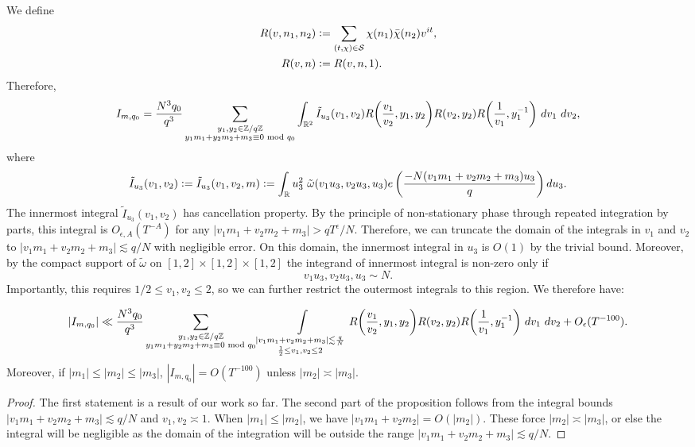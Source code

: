 We define \begin{align*}
	R(v,n_1,n_2)&\mathrel{\mathop:}= \sum_{(t,\chi)\in \mathcal{S}} 
	\chi({n_1})\bar{\chi}(n_2)v^{it},\\
	R(v,n)&\mathrel{\mathop:}= R(v,n,1).
\end{align*}
Therefore, \begin{equation*}
    I_{m,q_0} = \frac{N^3q_0}{q^3} \sum_{\substack{y_1,y_2 \in\mathbb{Z}/q\mathbb{Z} \\ y_1m_1+y_2m_2+m_3\equiv 0 \mod q_0}}\int_{\reals^2} \tilde{I}_{u_3}(v_1,v_2)  R{\left(\frac{v_1}{v_2},y_1,y_2\right)}R {\left(v_2,y_2\right)}R{\left(\frac{1}{v_1},y_1^{-1}\right)} \ dv_1\ dv_2,
\end{equation*}
    where\[
     \tilde{I}_{u_3}(v_1,v_2)\defeq \tilde{I}_{u_3}(v_1,v_2,m)\defeq \int_\reals u_3^2 \ \tilde{\omega}(v_1u_3,v_2u_3,u_3) e\left(\frac{-N(v_1m_1+v_2m_2+m_3)u_3}{q}\right)  du_3.\]
The innermost integral $\tilde{I}_{u_3}(v_1,v_2)$ has cancellation property. By the principle of non-stationary phase through repeated integration by parts, this integral is $O_{\epsilon, A}(T^{-A})$ for any $|v_1m_1+v_2m_2+m_3|>qT^\epsilon/N$. Therefore, we can truncate the domain of the integrals in $v_1$ and $v_2$ to  $|v_1m_1+v_2m_2+m_3|\lesssim q/N$ with negligible error. On this domain, the innermost integral in $u_3$ is $O(1)$ by the trivial bound. Moreover, by the compact support of $\tilde{\omega}$ on $[1,2]\times [1,2]\times [1,2]$  the integrand of innermost integral is non-zero only if \[
v_1u_3,v_2u_3,u_3\sim N.
\]
Importantly, this requires $1/2 \leq v_1,v_2 \leq 2$, so we can further restrict the outermost integrals to this region. 
We therefore have: 
\begin{proposition} \label{domainreduction}
    \[
    |I_{m,q_0}|\ll \frac{N^3q_0}{q^3}\sum_{\substack{y_1,y_2 \in\mathbb{Z}/q\mathbb{Z} \\ y_1m_1+y_2m_2+m_3\equiv 0 \mod q_0}}\int\displaylimits_{\substack{
        |v_1m_1+v_2m_2+m_3|\lesssim \frac{q}{N}\\
        \frac{1}{2}\leq v_1,v_2\leq 2
}}  R{\left(\frac{v_1}{v_2},y_1,y_2\right)}R {\left(v_2,y_2\right)}R{\left(\frac{1}{v_1},y_1^{-1}\right)} \ dv_1\ dv_2+O_{\epsilon}(T^{-100}).
    \]
    Moreover, if $|m_1|\leq|m_2|\leq |m_3|$, $|I_{m,q_0}|=O(T^{-100})$ unless $|m_2|\asymp|m_3|$.
\end{proposition}
\begin{proof}
    The first statement is a result of our work so far. The second part of the proposition follows from the integral bounds $|v_1m_1+v_2m_2+m_3|\lesssim q/N$
    and $v_1,v_2\asymp 1$. When $|m_1|\leq |m_2|$, we have $|v_1m_1+v_2m_2|=O(|m_2|)$. These force $|m_2| \asymp|m_3|$, or else the integral will be negligible as the domain of the integration will be outside the range $|v_1m_1+v_2m_2+m_3|\lesssim q/N$.
\end{proof}
